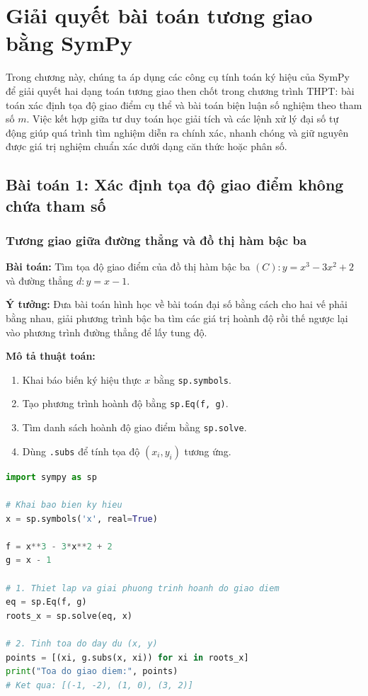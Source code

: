 \chapter{Giải quyết bài toán tương giao bằng SymPy}

Trong chương này, chúng ta áp dụng các công cụ tính toán ký hiệu của SymPy để giải quyết hai dạng toán tương giao then chốt trong chương trình THPT: bài toán xác định tọa độ giao điểm cụ thể và bài toán biện luận số nghiệm theo tham số $m$. Việc kết hợp giữa tư duy toán học giải tích và các lệnh xử lý đại số tự động giúp quá trình tìm nghiệm diễn ra chính xác, nhanh chóng và giữ nguyên được giá trị nghiệm chuẩn xác dưới dạng căn thức hoặc phân số.

\section{Bài toán 1: Xác định tọa độ giao điểm không chứa tham số}

\subsection{Tương giao giữa đường thẳng và đồ thị hàm bậc ba}

\textbf{Bài toán:} Tìm tọa độ giao điểm của đồ thị hàm bậc ba $(C): y = x^3 - 3x^2 + 2$ và đường thẳng $d: y = x - 1$.

\noindent\textbf{Ý tưởng:} Đưa bài toán hình học về bài toán đại số bằng cách cho hai vế phải bằng nhau, giải phương trình bậc ba tìm các giá trị hoành độ rồi thế ngược lại vào phương trình đường thẳng để lấy tung độ.

\noindent\textbf{Mô tả thuật toán:}
\begin{enumerate}
    \item Khai báo biến ký hiệu thực $x$ bằng \texttt{sp.symbols}.
    \item Tạo phương trình hoành độ bằng \texttt{sp.Eq(f, g)}.
    \item Tìm danh sách hoành độ giao điểm bằng \texttt{sp.solve}.
    \item Dùng \texttt{.subs} để tính tọa độ $(x_i, y_i)$ tương ứng.
\end{enumerate}

\begin{lstlisting}[language=Python, caption={Xác định giao điểm hàm bậc ba và đường thẳng}]
import sympy as sp

# Khai bao bien ky hieu
x = sp.symbols('x', real=True)

f = x**3 - 3*x**2 + 2
g = x - 1

# 1. Thiet lap va giai phuong trinh hoanh do giao diem
eq = sp.Eq(f, g)
roots_x = sp.solve(eq, x)

# 2. Tinh toa do day du (x, y)
points = [(xi, g.subs(x, xi)) for xi in roots_x]
print("Toa do giao diem:", points)
# Ket qua: [(-1, -2), (1, 0), (3, 2)]
\end{lstlisting}

